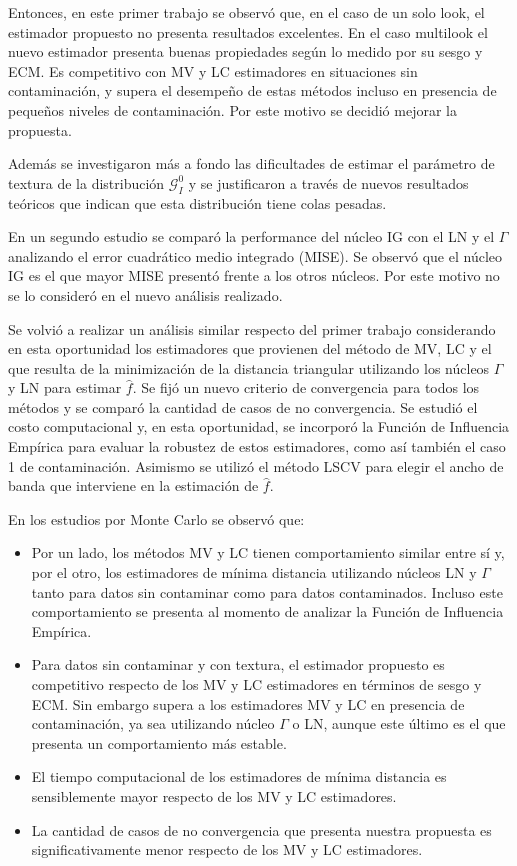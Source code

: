Entonces, en este primer trabajo se observó que, en el caso de un solo look, el estimador propuesto no presenta resultados excelentes. En el caso multilook el nuevo estimador presenta buenas propiedades según lo medido
por su sesgo y ECM. Es competitivo con MV y LC estimadores en situaciones sin contaminación, y supera el desempeño de estas métodos incluso en presencia de pequeños niveles de contaminación. Por este motivo se decidió mejorar la propuesta. 

Además se investigaron más a fondo las dificultades de estimar el parámetro de textura de la distribución $\mathcal{G}_I^0$  y se justificaron a través de nuevos resultados teóricos que indican que esta distribución tiene colas pesadas.

En un segundo estudio se comparó la performance del núcleo IG con el LN y el $\Gamma$ analizando el error cuadrático medio integrado (MISE). Se observó que el núcleo IG es el que mayor MISE presentó frente a los otros núcleos. Por este motivo no se lo consideró en el nuevo análisis realizado.

Se volvió a realizar un análisis similar respecto del primer trabajo considerando en esta oportunidad los estimadores que provienen del método de MV, LC y el que resulta de la minimización de la distancia triangular utilizando los núcleos $\Gamma$ y LN para estimar $\widehat{f}$. Se fijó un nuevo criterio de convergencia para todos los métodos y se comparó la cantidad de casos de no convergencia. Se estudió el costo computacional y, en esta oportunidad, se incorporó la Función de Influencia Empírica para evaluar la robustez de estos estimadores, como así también el caso 1 de contaminación. Asimismo se utilizó el método LSCV para elegir el ancho de banda que interviene en la estimación de $\widehat{f}$. 

En los estudios por Monte Carlo se observó que:

\begin{itemize}
	\item Por un lado, los métodos MV y LC tienen comportamiento similar entre sí y, por el otro, los estimadores de mínima distancia utilizando núcleos LN y $\Gamma$ tanto para datos sin contaminar como para datos contaminados. Incluso este comportamiento se presenta al momento de analizar la Función de Influencia Empírica.
	\item Para datos sin contaminar y con textura, el estimador propuesto es competitivo respecto de los MV y LC estimadores en términos de sesgo y ECM. Sin embargo supera a los estimadores MV y LC en presencia de contaminación, ya sea utilizando núcleo $\Gamma$ o LN, aunque este último es el que presenta un comportamiento más estable.
	\item El tiempo computacional de los estimadores de mínima distancia es sensiblemente mayor respecto de los MV y LC estimadores.
	\item La cantidad de casos de no convergencia que presenta nuestra propuesta es significativamente menor respecto de los MV y LC estimadores.
\end{itemize}


